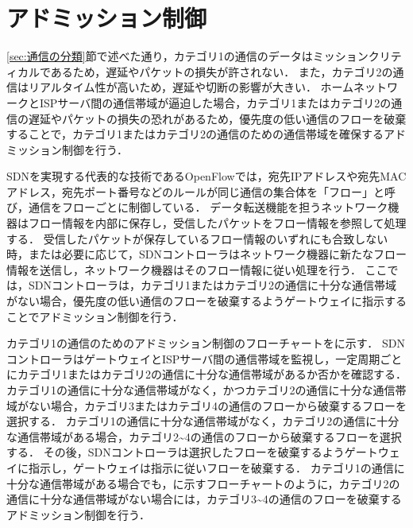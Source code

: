 \documentclass[a4paper,11pt,uplatex]{ujreport}
\begin{document}
\section{アドミッション制御}
\label{sec:アドミッション制御}

  \ref{sec:通信の分類}節で述べた通り，カテゴリ1の通信のデータはミッションクリティカルであるため，遅延やパケットの損失が許されない．
  また，カテゴリ2の通信はリアルタイム性が高いため，遅延や切断の影響が大きい．
  ホームネットワークとISPサーバ間の通信帯域が逼迫した場合，カテゴリ1またはカテゴリ2の通信の遅延やパケットの損失の恐れがあるため，優先度の低い通信のフローを破棄することで，カテゴリ1またはカテゴリ2の通信のための通信帯域を確保するアドミッション制御を行う．\par

  SDNを実現する代表的な技術であるOpenFlowでは，宛先IPアドレスや宛先MACアドレス，宛先ポート番号などのルールが同じ通信の集合体を「フロー」と呼び，通信をフローごとに制御している．
  データ転送機能を担うネットワーク機器はフロー情報を内部に保存し，受信したパケットをフロー情報を参照して処理する．
  受信したパケットが保存しているフロー情報のいずれにも合致しない時，または必要に応じて，SDNコントローラはネットワーク機器に新たなフロー情報を送信し，ネットワーク機器はそのフロー情報に従い処理を行う．
  ここでは，SDNコントローラは，カテゴリ1またはカテゴリ2の通信に十分な通信帯域がない場合，優先度の低い通信のフローを破棄するようゲートウェイに指示することでアドミッション制御を行う．\par


  カテゴリ1の通信のためのアドミッション制御のフローチャートをに示す．
  SDNコントローラはゲートウェイとISPサーバ間の通信帯域を監視し，一定周期ごとにカテゴリ1またはカテゴリ2の通信に十分な通信帯域があるか否かを確認する．
  カテゴリ1の通信に十分な通信帯域がなく，かつカテゴリ2の通信に十分な通信帯域がない場合，カテゴリ3またはカテゴリ4の通信のフローから破棄するフローを選択する．
  カテゴリ1の通信に十分な通信帯域がなく，カテゴリ2の通信に十分な通信帯域がある場合，カテゴリ2\textasciitilde4の通信のフローから破棄するフローを選択する．
  その後，SDNコントローラは選択したフローを破棄するようゲートウェイに指示し，ゲートウェイは指示に従いフローを破棄する．
  カテゴリ1の通信に十分な通信帯域がある場合でも，に示すフローチャートのように，カテゴリ2の通信に十分な通信帯域がない場合には，カテゴリ3\textasciitilde4の通信のフローを破棄するアドミッション制御を行う．\par
\end{document}

